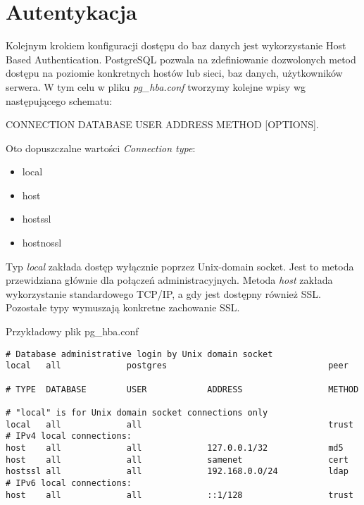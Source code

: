 	\section{Autentykacja}
Kolejnym krokiem konfiguracji dostępu do baz danych jest wykorzystanie Host Based Authentication. PostgreSQL pozwala na zdefiniowanie dozwolonych metod dostępu na poziomie konkretnych hostów lub sieci, baz danych, użytkowników serwera. W tym celu w pliku \textit{pg\_hba.conf} tworzymy kolejne wpisy wg następującego schematu:
\begin{center}
\colorbox{code-gray}{CONNECTION   DATABASE  USER  ADDRESS  METHOD  [OPTIONS]}.
\end{center}
Oto dopuszczalne wartości \textit{Connection type}:

\begin{itemize}
	\item local
	\item host
	\item hostssl
	\item hostnossl
\end{itemize}

Typ \textit{local} zakłada dostęp wyłącznie poprzez Unix-domain socket. Jest to metoda przewidziana głównie dla połączeń administracyjnych. Metoda \textit{host} zakłada wykorzystanie standardowego TCP/IP, a gdy jest dostępny również SSL. Pozostałe typy wymuszają konkretne zachowanie SSL.

Przykładowy plik pg\_hba.conf
\begin{lstlisting}
# Database administrative login by Unix domain socket
local   all             postgres                                peer

# TYPE  DATABASE        USER            ADDRESS                 METHOD

# "local" is for Unix domain socket connections only
local   all             all                                     trust
# IPv4 local connections:
host    all             all             127.0.0.1/32            md5
host    all             all             samenet                 cert
hostssl	all             all             192.168.0.0/24			ldap
# IPv6 local connections:
host    all             all             ::1/128                 trust
\end{lstlisting}


